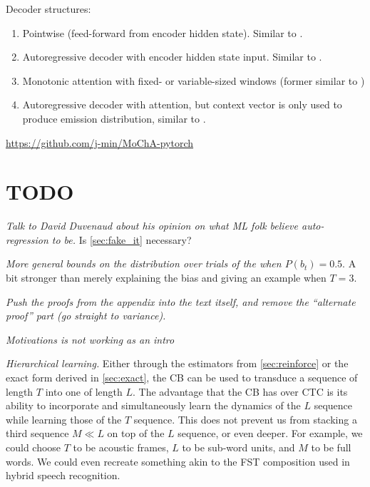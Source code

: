 \documentclass{article}
\begin{document}
Decoder structures:
%
\begin{enumerate}
    \item Pointwise (feed-forward from encoder hidden state). Similar to
          \citet{luoLearningOnlineAlignments2017,lawsonLearningHardAlignments2018}.
    \item Autoregressive decoder with encoder hidden state input. Similar to
          \citet{raffelOnlineLineartimeAttention2017}.
    \item Monotonic attention with fixed- or variable-sized windows
          (former similar to \citet{chiuMonotonicChunkwiseAttention2018})
    \item Autoregressive decoder with attention, but context vector is only
          used to produce emission distribution, similar to
          \citet{wuHardNonmonotonicAttention2018,wuExactHardMonotonic2019}.
\end{enumerate}
%

\url{https://github.com/j-min/MoChA-pytorch}




\appendix

\section{TODO}

\emph{Talk to David Duvenaud about his opinion on what ML folk believe
auto-regression to be.} Is \cref{sec:fake_it} necessary?

\emph{More general bounds on the distribution over trials of the
\citeauthor{luoLearningOnlineAlignments2017} when $P(b_t) = 0.5$}. A bit
stronger than merely explaining the bias and giving an example when $T = 3$.

\emph{Push the proofs from the appendix into the text itself, and remove
the ``alternate proof'' part (go straight to variance).}

\emph{Motivations is not working as an intro}

\emph{Hierarchical learning.} Either through the estimators from
\cref{sec:reinforce} or the exact form derived in \cref{sec:exact}, the CB can
be used to transduce a sequence of length $T$ into one of length $L$. The
advantage that the CB has over CTC is its ability to incorporate and
simultaneously learn the dynamics of the $L$ sequence while learning those of
the $T$ sequence. This does not prevent us from stacking a third sequence
$M \ll L$ on top of the $L$ sequence, or even deeper. For example, we could
choose $T$ to be acoustic frames, $L$ to be sub-word units, and $M$ to be full
words. We could even recreate something akin to the FST composition used in
hybrid speech recognition.
\end{document}
